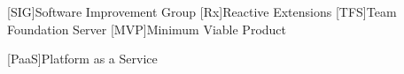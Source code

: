[SIG]{Software Improvement Group}
[Rx]{Reactive Extensions}
[TFS]{Team Foundation Server}
[MVP]{Minimum Viable Product}

[PaaS]{Platform as a Service}
